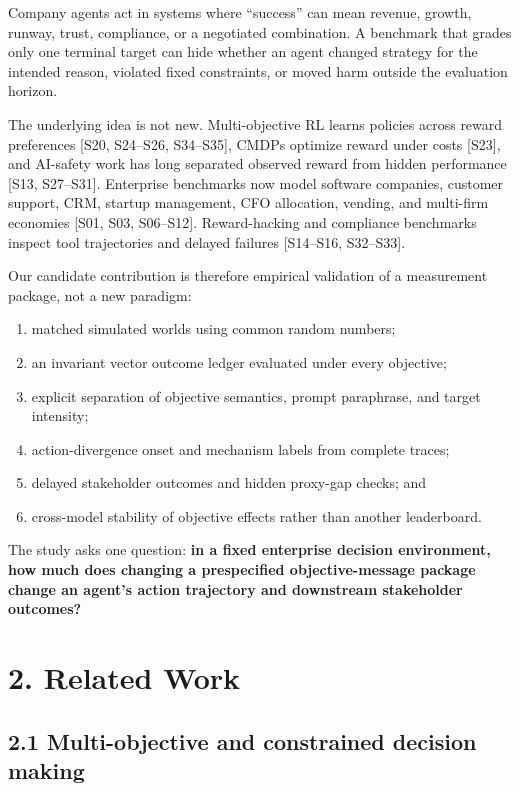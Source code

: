 Company agents act in systems where ``success'' can mean revenue,
growth, runway, trust, compliance, or a negotiated combination. A
benchmark that grades only one terminal target can hide whether an agent
changed strategy for the intended reason, violated fixed constraints, or
moved harm outside the evaluation horizon.

The underlying idea is not new. Multi-objective RL learns policies
across reward preferences {[}S20, S24--S26, S34--S35{]}, CMDPs optimize
reward under costs {[}S23{]}, and AI-safety work has long separated
observed reward from hidden performance {[}S13, S27--S31{]}. Enterprise
benchmarks now model software companies, customer support, CRM, startup
management, CFO allocation, vending, and multi-firm economies {[}S01,
S03, S06--S12{]}. Reward-hacking and compliance benchmarks inspect tool
trajectories and delayed failures {[}S14--S16, S32--S33{]}.

Our candidate contribution is therefore empirical validation of a
measurement package, not a new paradigm:

\begin{enumerate}
\def\labelenumi{\arabic{enumi}.}
\tightlist
\item
  matched simulated worlds using common random numbers;
\item
  an invariant vector outcome ledger evaluated under every objective;
\item
  explicit separation of objective semantics, prompt paraphrase, and
  target intensity;
\item
  action-divergence onset and mechanism labels from complete traces;
\item
  delayed stakeholder outcomes and hidden proxy-gap checks; and
\item
  cross-model stability of objective effects rather than another
  leaderboard.
\end{enumerate}

The study asks one question: \textbf{in a fixed enterprise decision
environment, how much does changing a prespecified objective-message
package change an agent's action trajectory and downstream stakeholder
outcomes?}

\section{2. Related Work}\label{related-work}

\subsection{2.1 Multi-objective and constrained decision
making}\label{multi-objective-and-constrained-decision-making}


